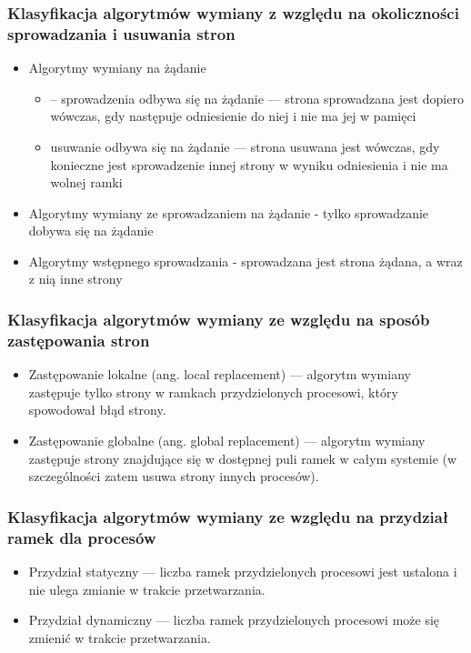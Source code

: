 \documentclass[12pt]{article}
\begin{document}
    \subsubsection{Klasyfikacja algorytmów wymiany z względu na okoliczności sprowadzania i usuwania stron}
    \begin{itemize}
        \item Algorytmy wymiany na żądanie
        \begin{itemize}
            \item – sprowadzenia odbywa się na żądanie — strona sprowadzana jest dopiero wówczas, gdy następuje odniesienie do niej i nie ma
            jej w pamięci
            \item usuwanie odbywa się na żądanie — strona usuwana jest wówczas, gdy konieczne jest sprowadzenie innej strony w wyniku
            odniesienia i nie ma wolnej ramki
        \end{itemize}
        \item Algorytmy wymiany ze sprowadzaniem na żądanie - tylko sprowadzanie dobywa się na żądanie
        \item Algorytmy wstępnego sprowadzania - sprowadzana jest strona żądana, a wraz z nią inne strony
    \end{itemize}
    
    \subsubsection{Klasyfikacja algorytmów wymiany ze względu na sposób zastępowania stron}
    \begin{itemize}
        \item Zastępowanie lokalne (ang. local replacement) — algorytm wymiany zastępuje tylko strony w ramkach przydzielonych procesowi,
        który spowodował błąd strony.
        \item Zastępowanie globalne (ang. global replacement) — algorytm wymiany zastępuje strony znajdujące się w dostępnej puli ramek w
        całym systemie (w szczególności zatem usuwa strony innych procesów).
    \end{itemize}
    
    \subsubsection{Klasyfikacja algorytmów wymiany ze względu na przydział ramek dla procesów}
    \begin{itemize}
        \item Przydział statyczny — liczba ramek przydzielonych procesowi jest ustalona i nie ulega zmianie w trakcie przetwarzania.
        \item Przydział dynamiczny — liczba ramek przydzielonych procesowi może się zmienić w trakcie przetwarzania.
    \end{itemize}
    
\end{document}
